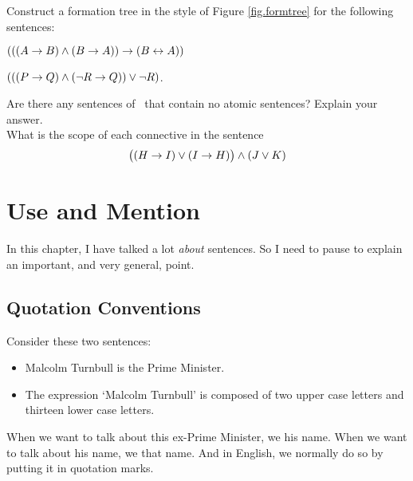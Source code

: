 \problempart
Construct a formation tree in the style of Figure \ref{fig.formtree} for the following sentences: \begin{earg}
	\item $(((A \rightarrow B) \wedge (B \rightarrow A)) \rightarrow (B \leftrightarrow A))$
	\item $(((P \rightarrow Q) \wedge (\neg R \rightarrow Q)) \vee \neg R)$.
\end{earg}

\problempart
Are there any sentences of \TFL\ that contain no atomic sentences? Explain your answer.\\

\problempart
What is the scope of each connective in the sentence
$$\bigl( (H \rightarrow I) \vee (I \rightarrow H) \bigr) \wedge (J \vee K)$$


\chapter{Use and Mention}\label{s:UseMention}
In this chapter, I have talked a lot \emph{about} sentences. So I need to pause to explain an important, and very general, point.

\section{Quotation Conventions}
Consider these two sentences:
	\begin{itemize}
		\item Malcolm Turnbull is the Prime Minister.
		\item The expression `Malcolm Turnbull' is composed of two upper case letters and thirteen lower case letters.
	\end{itemize}
When we want to talk about this ex-Prime Minister, we  his name. When we want to talk about his name, we  that name. And in English, we normally do so by putting it in quotation marks.

